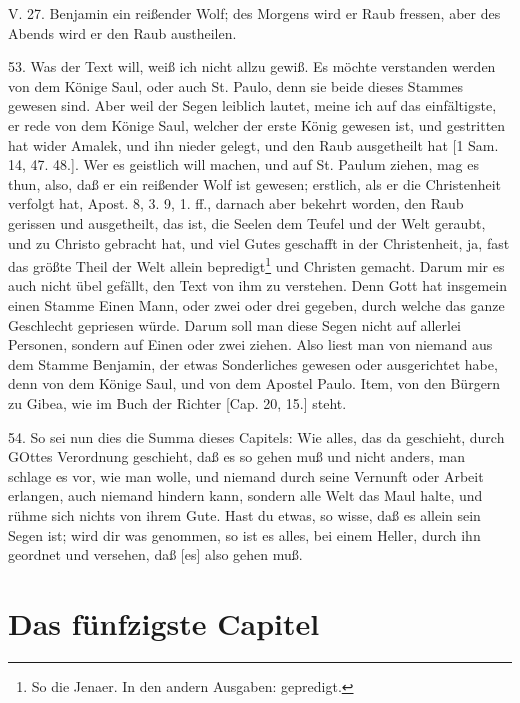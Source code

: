 \begin{schriftzitat}
V. 27. Benjamin ein reißender Wolf; des Morgens wird er Raub fressen, aber des Abends wird er den Raub austheilen.
\end{schriftzitat}

53. Was der Text will, weiß ich nicht allzu gewiß. Es möchte verstanden werden von dem Könige Saul, oder auch St. Paulo, denn sie beide dieses Stammes gewesen sind. Aber weil der Segen leiblich lautet, meine ich auf das einfältigste, er rede von dem Könige Saul, welcher der erste König gewesen ist, und gestritten hat wider Amalek, und ihn nieder gelegt, und den Raub ausgetheilt hat [1 Sam. 14, 47. 48.]. Wer es geistlich will machen, und auf St. Paulum ziehen, mag es thun, also, daß er ein reißender Wolf ist gewesen; erstlich, als er die Christenheit verfolgt hat, Apost. 8, 3. 9, 1. ff., darnach aber bekehrt worden, den Raub gerissen und ausgetheilt, das ist, die Seelen dem Teufel und der Welt geraubt, und zu Christo gebracht hat, und viel Gutes geschafft in der Christenheit, ja, fast das größte Theil der Welt allein bepredigt\footnote{So die Jenaer. In den andern Ausgaben: gepredigt.} und Christen gemacht. Darum mir es auch nicht übel gefällt, den Text von ihm zu verstehen. Denn Gott hat insgemein einen Stamme Einen Mann, oder zwei oder drei gegeben, durch welche das ganze Geschlecht gepriesen würde. Darum soll man diese Segen nicht auf allerlei Personen, sondern auf Einen oder zwei ziehen. Also liest man von niemand aus dem Stamme Benjamin, der etwas Sonderliches gewesen oder ausgerichtet habe, denn von dem Könige Saul, und von dem Apostel Paulo. Item, von den Bürgern zu Gibea, wie im Buch der Richter [Cap. 20, 15.] steht.

54. So sei nun dies die Summa dieses Capitels: Wie alles, das da geschieht, durch GOttes Verordnung geschieht, daß es so gehen muß und nicht anders, man schlage es vor, wie man wolle, und niemand durch seine Vernunft oder Arbeit erlangen, auch niemand hindern kann, sondern alle Welt das Maul halte, und rühme sich nichts von ihrem Gute. Hast du etwas, so wisse, daß es allein sein Segen ist; wird dir was genommen, so ist es alles, bei einem Heller, durch ihn geordnet und versehen, daß [es] also gehen muß.

\section{Das fünfzigste Capitel}

